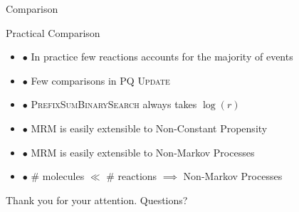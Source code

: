 \documentclass{beamer}
\begin{document}
\begin{frame}{Comparison}
  \begin{block}{Practical Comparison}
    \begin{itemize} 
    \item $\bullet$ In practice few reactions accounts for the majority of events
    \item $\bullet$ Few comparisons in PQ \textsc{Update}
    \item $\bullet$ \textsc{PrefixSumBinarySearch} always takes $\log(r)$
    \item $\bullet$ MRM is easily extensible to Non-Constant Propensity
    \item $\bullet$ MRM is easily extensible to Non-Markov Processes
    \item $\bullet$ \# molecules $\ll$ \# reactions $\implies$ Non-Markov Processes 
    \end{itemize}
  \end{block}
\end{frame}

\begin{frame}
  \begin{center}
    \Huge{Thank you for your attention.}
    \Huge{Questions?}
  \end{center}
\end{frame}
\end{document}
